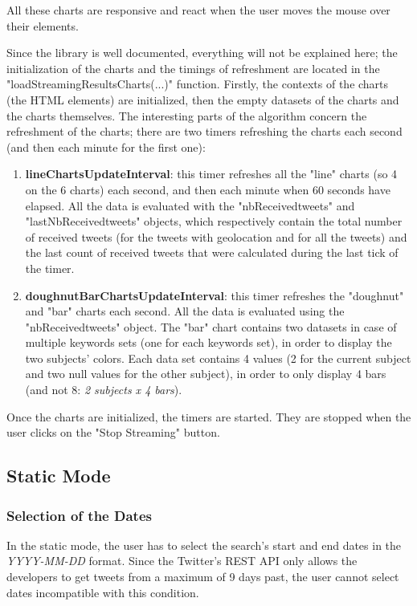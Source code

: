 \documentclass[a4paper,11pt]{report}
\begin{document}
All these charts are responsive and react when the user moves the mouse over their elements.
\newpage

Since the library is well documented, everything will not be explained here; the initialization of the charts and the timings of refreshment are located in the "loadStreamingResultsCharts(...)" function. Firstly, the contexts of the charts (the HTML elements) are initialized, then the empty datasets of the charts and the charts themselves. The interesting parts of the algorithm concern the refreshment of the charts; there are two timers refreshing the charts each second (and then each minute for the first one):
\begin{enumerate}
	\item \textbf{lineChartsUpdateInterval}: this timer refreshes all the "line" charts (so 4 on the 6 charts) each second, and then each minute when 60 seconds have elapsed. All the data is evaluated with the "nbReceivedtweets" and "lastNbReceivedtweets" objects, which respectively contain the total number of received tweets (for the tweets with geolocation and for all the tweets) and the last count of received tweets that were calculated during the last tick of the timer.
	\item \textbf{doughnutBarChartsUpdateInterval}: this timer refreshes the "doughnut" and "bar" charts each second. All the data is evaluated using the "nbReceivedtweets" object. The "bar" chart contains two datasets in case of multiple keywords sets (one for each keywords set), in order to display the two subjects' colors. Each data set contains 4 values (2 for the current subject and two null values for the other subject), in order to only display 4 bars (and not 8: \emph{2 subjects x 4 bars}).
\end{enumerate}

Once the charts are initialized, the timers are started. They are stopped when the user clicks on the "Stop Streaming" button.
\bigskip

\subsection{Static Mode}
\subsubsection{Selection of the Dates}
In the static mode, the user has to select the search's start and end dates in the \emph{YYYY-MM-DD} format. Since the Twitter's REST API only allows the developers to get tweets from a maximum of 9 days past, the user cannot select dates incompatible with this condition.\\
\end{document}

